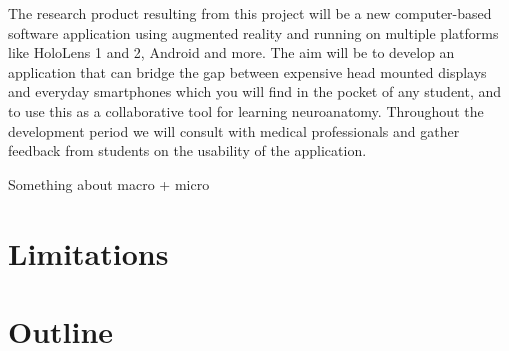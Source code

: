 The research product resulting from this project will be a new computer-based software application using augmented reality and running on multiple platforms like HoloLens 1 and 2, Android and more. The aim will be to develop an application that can bridge the gap between expensive head mounted displays and everyday smartphones which you will find in the pocket of any student, and to use this as a collaborative tool for learning neuroanatomy. Throughout the development period we will consult with medical professionals and gather feedback from students on the usability of the application.

{
    \color{BrickRed}
    \noindent
    \newline
    Something about macro + micro
}

\section{Limitations}

\section{Outline}

